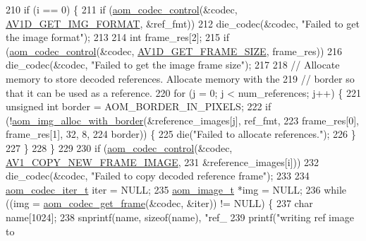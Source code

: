 \begin{DoxyCodeInclude}
{{{{210     \textcolor{keywordflow}{if} (i == 0) \{
211       \textcolor{keywordflow}{if} (\hyperlink{group__codec_ga6da974f4eeaba1fa74106b28d0fe6ac5}{aom\_codec\_control}(&codec, \hyperlink{group__aom__decoder_gga3865fd4b3192489baa9a5c3632ebe97bacd7229e5fb766670fe995739931c2ee3}{AV1D\_GET\_IMG\_FORMAT}, &ref\_fmt))
212         die\_codec(&codec, \textcolor{stringliteral}{"Failed to get the image format"});
213 
214       \textcolor{keywordtype}{int} frame\_res[2];
215       \textcolor{keywordflow}{if} (\hyperlink{group__codec_ga6da974f4eeaba1fa74106b28d0fe6ac5}{aom\_codec\_control}(&codec, \hyperlink{group__aom__decoder_gga3865fd4b3192489baa9a5c3632ebe97ba175c454a7adf2d3927a0e979b4a2b07b}{AV1D\_GET\_FRAME\_SIZE}, frame\_res))
216         die\_codec(&codec, \textcolor{stringliteral}{"Failed to get the image frame size"});
217 
218       \textcolor{comment}{// Allocate memory to store decoded references. Allocate memory with the}
219       \textcolor{comment}{// border so that it can be used as a reference.}
220       \textcolor{keywordflow}{for} (j = 0; j < num\_references; j++) \{
221         \textcolor{keywordtype}{unsigned} \textcolor{keywordtype}{int} border = AOM\_BORDER\_IN\_PIXELS;
222         \textcolor{keywordflow}{if} (!\hyperlink{aom__image_8h_aeb211e5184687f7e10d7c5bed4dcfdcd}{aom\_img\_alloc\_with\_border}(&reference\_images[j], ref\_fmt,
223                                        frame\_res[0], frame\_res[1], 32, 8,
224                                        border)) \{
225           die(\textcolor{stringliteral}{"Failed to allocate references."});
226         \}
227       \}
228     \}
229 
230     \textcolor{keywordflow}{if} (\hyperlink{group__codec_ga6da974f4eeaba1fa74106b28d0fe6ac5}{aom\_codec\_control}(&codec, \hyperlink{group__aom_gga9421a1fa78c0d9587ae5aa6c1cb3d659ae41763622ee33cd99e23ca8f78a3f8fa}{AV1\_COPY\_NEW\_FRAME\_IMAGE},
231                           &reference\_images[i]))
232       die\_codec(&codec, \textcolor{stringliteral}{"Failed to copy decoded reference frame"});
233 
234     \hyperlink{group__codec_gadf9e173c9e02788a9999399edab20a02}{aom\_codec\_iter\_t} iter = NULL;
235     \hyperlink{structaom__image}{aom\_image\_t} *img = NULL;
236     \textcolor{keywordflow}{while} ((img = \hyperlink{group__decoder_ga780aad27a2728abefab725faa3bc4f79}{aom\_codec\_get\_frame}(&codec, &iter)) != NULL) \{
237       \textcolor{keywordtype}{char} name[1024];
238       snprintf(name, \textcolor{keyword}{sizeof}(name), \textcolor{stringliteral}{"ref\_%
239       printf(\textcolor{stringliteral}{"writing ref image to %
}}}}}}
\end{DoxyCodeInclude}
